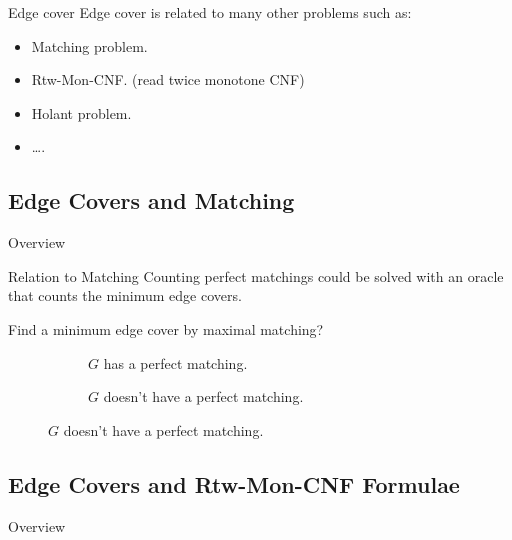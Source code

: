 \documentclass[mathserif]{beamer}
\begin{document}
\begin{frame}{Edge cover}
	Edge cover is related to many other problems such as:
	\begin{itemize}
		\item Matching problem.
		\item Rtw-Mon-CNF. (read twice monotone CNF)
		\item Holant problem.
		\item \dots.
	\end{itemize}
\end{frame}

\subsection{Edge Covers and Matching}
\begin{frame}{Overview}
	\tableofcontents[currentsubsection, hideothersubsections, sectionstyle=show/shaded, subsectionstyle=show/shaded]
\end{frame}
\begin{frame}{Relation to Matching}
	Counting perfect matchings could be solved with an oracle that counts the minimum edge covers.
	\bigskip 
	\begin{example}
		Find a minimum edge cover by maximal matching?
		\begin{figure}[htp]
			\begin{subfigure}[b]{0.49\textwidth}
				\centering
				
				\caption{$G$ has a perfect matching.}
			\end{subfigure}
			\hfill
			\begin{subfigure}[b]{0.49\textwidth}
				\centering
				

				\caption{$G$ doesn't have a perfect matching.}
			\end{subfigure}
		\end{figure}
	\end{example}
\end{frame}

\subsection{Edge Covers and Rtw-Mon-CNF Formulae}
\begin{frame}{Overview}
	\tableofcontents[currentsubsection, hideothersubsections, sectionstyle=show/shaded, subsectionstyle=show/shaded]
\end{frame}
\end{document}
